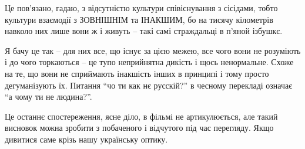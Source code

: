 Це пов'язано, гадаю, з відсутністю культури співіснування з сісідами, тобто
культури взаємодії з ЗОВНІШНІМ та ІНАКШИМ, бо на тисячу кілометрів навколо них
лише вони ж і живуть – такі самі страждальці в п'яной ізбушкє. 

Я бачу це так – для них все, що існує за цією межею, все чого вони не розуміють
і до чого торкаються – це тупо неприйнятна дикість і щось ненормальне. Схоже на
те, що вони не сприймають інакшість інших в принципі і тому просто
дегуманізують їх. Питання \enquote{чо ти как нє русскій?} в чесному перекладі означає
\enquote{а чому ти не людина?}.

Це останнє спостереження, ясне діло, в фільмі не артикулюється, але такий
висновок можна зробити з побаченого і відчутого під час перегляду. Якщо
дивитися саме крізь нашу українську оптику.
